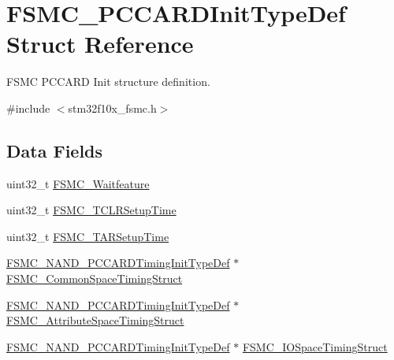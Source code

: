 \hypertarget{struct_f_s_m_c___p_c_c_a_r_d_init_type_def}{}\section{F\+S\+M\+C\+\_\+\+P\+C\+C\+A\+R\+D\+Init\+Type\+Def Struct Reference}
\label{struct_f_s_m_c___p_c_c_a_r_d_init_type_def}


F\+S\+MC P\+C\+C\+A\+RD Init structure definition.  




{\ttfamily \#include $<$stm32f10x\+\_\+fsmc.\+h$>$}

\subsection*{Data Fields}
\begin{DoxyCompactItemize}
\item 
uint32\+\_\+t \mbox{\hyperlink{struct_f_s_m_c___p_c_c_a_r_d_init_type_def_a9ecc2cc3ec6462a8a86e545c9b8ff3cf}{F\+S\+M\+C\+\_\+\+Waitfeature}}
\item 
uint32\+\_\+t \mbox{\hyperlink{struct_f_s_m_c___p_c_c_a_r_d_init_type_def_ab9fd4e9d4db1fc098d5f4ccffb80bf61}{F\+S\+M\+C\+\_\+\+T\+C\+L\+R\+Setup\+Time}}
\item 
uint32\+\_\+t \mbox{\hyperlink{struct_f_s_m_c___p_c_c_a_r_d_init_type_def_ab1fc3b07b6286b4974690191231f2773}{F\+S\+M\+C\+\_\+\+T\+A\+R\+Setup\+Time}}
\item 
\mbox{\hyperlink{struct_f_s_m_c___n_a_n_d___p_c_c_a_r_d_timing_init_type_def}{F\+S\+M\+C\+\_\+\+N\+A\+N\+D\+\_\+\+P\+C\+C\+A\+R\+D\+Timing\+Init\+Type\+Def}} $\ast$ \mbox{\hyperlink{struct_f_s_m_c___p_c_c_a_r_d_init_type_def_aec43dfa3b0c0ef09b02ac1b27cac92c7}{F\+S\+M\+C\+\_\+\+Common\+Space\+Timing\+Struct}}
\item 
\mbox{\hyperlink{struct_f_s_m_c___n_a_n_d___p_c_c_a_r_d_timing_init_type_def}{F\+S\+M\+C\+\_\+\+N\+A\+N\+D\+\_\+\+P\+C\+C\+A\+R\+D\+Timing\+Init\+Type\+Def}} $\ast$ \mbox{\hyperlink{struct_f_s_m_c___p_c_c_a_r_d_init_type_def_a96d5a1d02a42f194b9d5ebaae46dd3d7}{F\+S\+M\+C\+\_\+\+Attribute\+Space\+Timing\+Struct}}
\item 
\mbox{\hyperlink{struct_f_s_m_c___n_a_n_d___p_c_c_a_r_d_timing_init_type_def}{F\+S\+M\+C\+\_\+\+N\+A\+N\+D\+\_\+\+P\+C\+C\+A\+R\+D\+Timing\+Init\+Type\+Def}} $\ast$ \mbox{\hyperlink{struct_f_s_m_c___p_c_c_a_r_d_init_type_def_ad3bf6a882f03e3406149d94585dce78e}{F\+S\+M\+C\+\_\+\+I\+O\+Space\+Timing\+Struct}}
\end{DoxyCompactItemize}


